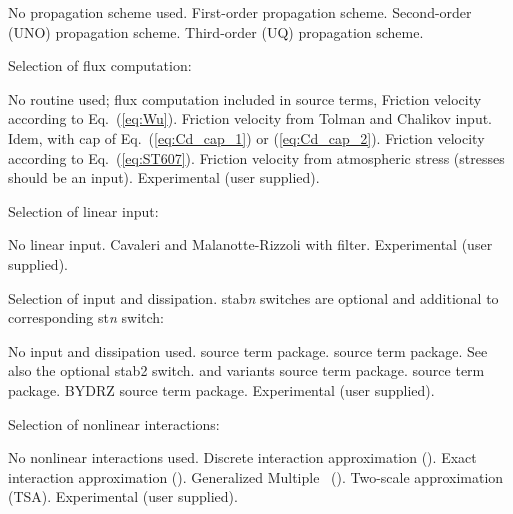 \begin{slist}
 {No propagation scheme used.}
 {First-order propagation scheme.}
 {Second-order (UNO) propagation scheme.}
 {Third-order (UQ) propagation scheme.}
\end{slist}

\noindent
Selection of flux computation:
\begin{slist}
 {No routine used; flux computation included in source terms,}
 {Friction velocity according to Eq.~(\ref{eq:Wu}).}
 {Friction velocity from Tolman and Chalikov input.}
 {Idem, with cap of Eq.~(\ref{eq:Cd_cap_1}) or (\ref{eq:Cd_cap_2}).}
 {Friction velocity according to Eq.~(\ref{eq:ST607}).}
 {Friction velocity from atmospheric stress (stresses should be an input).}
 {Experimental (user supplied).}
\end{slist}

\noindent
Selection of linear input:
\begin{slist}
 {No linear input.}
 {Cavaleri and Malanotte-Rizzoli with filter.}
 {Experimental (user supplied).}
\end{slist}

\noindent
Selection of input and dissipation. {\F stab{}\it n} switches are optional and
additional to corresponding {\F st{\it n}} switch:
\begin{slist}
 {No input and dissipation used.}
 {\wam{} source term package.}
 {\cite{tol:JPO96} source term package. See also the optional 
          {\F stab2} switch.}
 {\wam{} and variants source term package.}
 {\cite{art:Aea10} source term package.}
 {BYDRZ source term package.}
 {Experimental (user supplied).}
\end{slist}

\noindent
Selection of nonlinear interactions:
\begin{slist}
 {No nonlinear interactions used.}
 {Discrete interaction approximation (\dia).}
 {Exact interaction approximation (\xnl).}
 {Generalized Multiple \dia\ (\gmd).}
 {Two-scale approximation (TSA).} 
 {Experimental (user supplied).}
\end{slist}

